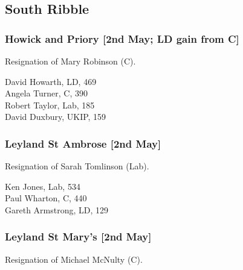 \documentclass[a4paper,openany,10pt]{book}
\begin{document}
\subsection*{South Ribble}

\subsubsection*{Howick and Priory \hspace*{\fill}\nolinebreak[1]%
\enspace\hspace*{\fill}
[2nd May; LD gain from C]}


Resignation of Mary Robinson (C).



David Howarth, LD, 469\\
Angela Turner, C, 390\\
Robert Taylor, Lab, 185\\
David Duxbury, UKIP, 159\\


\subsubsection*{Leyland St Ambrose \hspace*{\fill}\nolinebreak[1]%
\enspace\hspace*{\fill}
[2nd May]}


Resignation of Sarah Tomlinson (Lab).



Ken Jones, Lab, 534\\
Paul Wharton, C, 440\\
Gareth Armstrong, LD, 129\\


\subsubsection*{Leyland St Mary's \hspace*{\fill}\nolinebreak[1]%
\enspace\hspace*{\fill}
[2nd May]}


Resignation of Michael McNulty (C).
\end{document}
